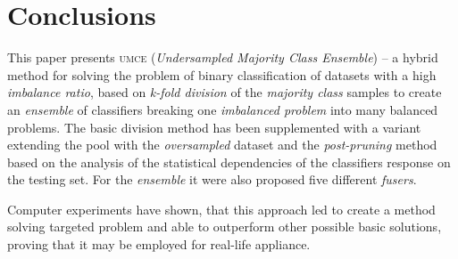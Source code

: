 \documentclass[pmlr]{jmlr}
\begin{document}
\section{Conclusions}
\label{sec:intro}

This paper presents \textsc{umce} (\emph{Undersampled Majority Class Ensemble}) -- a hybrid method for solving the problem of binary classification of datasets with a high \emph{imbalance ratio}, based on \emph{k-fold division} of the \emph{majority class} samples to create an \emph{ensemble} of classifiers breaking one \emph{imbalanced problem} into many balanced problems. The basic division method has been supplemented with a variant extending the pool with the \emph{oversampled} dataset and the \emph{post-pruning} method based on the analysis of the statistical dependencies of the classifiers response on the testing set. For the \emph{ensemble} it were also proposed five different \emph{fusers}.

Computer experiments have shown, that this approach led to create a method solving targeted problem and able to outperform other possible basic solutions, proving that it may be employed for real-life appliance.

\acks{
	---\\
	---\\
	---
}

\end{document}
